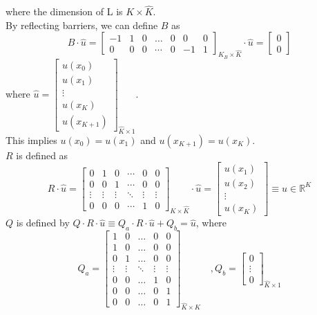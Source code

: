 \documentclass[11pt]{article}
\newcommand{\R}{\ensuremath{\mathbb{R}}}
\begin{document}
where the dimension of L is $K\times\hat{K}$.\\
By reflecting barriers, we can define $B$ as
\begin{equation}
B\cdot\hat{u} =\begin{bmatrix}
-1&1&0&\dots&0&0&0\\
0&0&0&\cdots&0&-1&1
\end{bmatrix}_{K_B\times \hat{K}}\cdot\hat{u} = \begin{bmatrix}
0\\
0
\end{bmatrix}
\end{equation}
where $\hat{u} = \begin{bmatrix}
u(x_0)\\
u(x_1)\\
\vdots\\
u(x_K)\\
u(x_{K+1})
\end{bmatrix}_{\hat{K}\times 1}$.\\
This implies $u(x_0) = u(x_1)$ and $u(x_{K+1}) = u(x_K)$.\\
$R$ is defined as 
\begin{equation}
R\cdot \hat{u} =\begin{bmatrix}
0&1&0&\cdots&0&0\\
0&0&1&\cdots&0&0\\
\vdots&\vdots&\vdots&\ddots&\vdots&\vdots\\
0&0&0&\cdots&1&0
\end{bmatrix}_{K\times\hat{K}}\cdot \hat{u}		 
=\begin{bmatrix}
u(x_1)\\
u(x_2)\\
\vdots\\
u(x_K)
\end{bmatrix} \equiv u\in \R^{K} 
\end{equation}
$Q$ is defined by $Q\cdot R\cdot\hat{u}\equiv Q_a\cdot R\cdot\hat{u}+Q_b = \hat{u}$, where 
\begin{equation}
Q_a = \begin{bmatrix}
1& 0&\dots&0&0\\
1&0&\dots&0&0\\
0&1&\dots&0&0\\
\vdots&\vdots&\ddots&\vdots&\vdots\\
0&0&\dots&1&0\\
0&0&\dots&0&1\\
0&0&\dots&0&1
\end{bmatrix}_{\hat{K}\times K}\quad , Q_b = \begin{bmatrix}
0\\
\vdots\\
0
\end{bmatrix}_{\hat{K}\times 1}
\end{equation}
\end{document}
